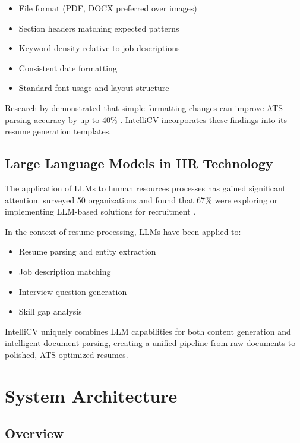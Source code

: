\documentclass[conference]{IEEEtran}
\begin{document}
\begin{itemize}
    \item File format (PDF, DOCX preferred over images)
    \item Section headers matching expected patterns
    \item Keyword density relative to job descriptions
    \item Consistent date formatting
    \item Standard font usage and layout structure
\end{itemize}

Research by \citeauthor{nguyen2022ats} demonstrated that simple formatting changes can improve ATS parsing accuracy by up to 40\% \cite{nguyen2022ats}. IntelliCV incorporates these findings into its resume generation templates.

\subsection{Large Language Models in HR Technology}

The application of LLMs to human resources processes has gained significant attention. \citeauthor{li2023hrllm} surveyed 50 organizations and found that 67\% were exploring or implementing LLM-based solutions for recruitment \cite{li2023hrllm}.

In the context of resume processing, LLMs have been applied to:
\begin{itemize}
    \item Resume parsing and entity extraction \cite{zhang2023parsing}
    \item Job description matching \cite{kumar2023matching}
    \item Interview question generation \cite{brown2023interview}
    \item Skill gap analysis \cite{patel2024skills}
\end{itemize}

IntelliCV uniquely combines LLM capabilities for both content generation and intelligent document parsing, creating a unified pipeline from raw documents to polished, ATS-optimized resumes.

\section{System Architecture}

\subsection{Overview}
\end{document}
